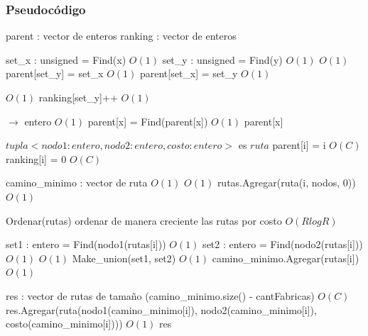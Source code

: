 \documentclass[a4paper, 10pt, twoside]{article}
\newenvironment{pseudo}[1][]{%
    \vspace{0.5em}%
    \begin{algorithmic}%
}
{%
    \end{algorithmic}%
    \vspace{0.5em}%
}
\newcommand{\Ode}[1]{\hfill $O(#1)$}
\begin{document}
\subsubsection{Pseudocódigo}
\begin{pseudo}

\State parent : vector de enteros
\State ranking : vector de enteros

    \State set\_x : unsigned = Find(x)										\Ode{1}
    \State set\_y : unsigned = Find(y)										\Ode{1}
    								\Ode{1}
		\State parent[set\_y] = set\_x										\Ode{1}
    \Else
        \State parent[set\_x] = set\_y										\Ode{1}
    \EndIf
    
    									\Ode{1}
        \State ranking[set\_y]++											\Ode{1}
    \EndIf
\EndProcedure



 $\rightarrow$ entero
    														\Ode{1}
        \State parent[x] = Find(parent[x])									\Ode{1}
    \EndIf
    \Return parent[x]
\EndProcedure



\State $tupla <nodo1 : entero, nodo2 : entero, costo : entero>$ es $ruta$
	 parent[i] = i \EndFor						\Ode{C}
	 ranking[i] = 0 \EndFor						\Ode{C}

    \State camino\_minimo : vector de ruta									\Ode{1}
    								\Ode{1}
        \State rutas.Agregar(ruta(i, nodos, 0))								\Ode{1}
    \EndFor

	

    \State Ordenar(rutas) ordenar de manera creciente las rutas por costo \Ode{R log R}

        \State set1 : entero = Find(nodo1(rutas[i]))						\Ode{1}
        \State set2 : entero = Find(nodo2(rutas[i]))						\Ode{1}
        													\Ode{1}
            \State Make\_union(set1, set2)									\Ode{1}
            \State camino\_minimo.Agregar(rutas[i])							\Ode{1}
        \EndIf    
    \EndFor

	 

    \State res : vector de rutas de tamaño (camino\_minimo.size() - cantFabricas)   \Ode{C}
        \State res.Agregar(ruta(nodo1(camino\_minimo[i]), nodo2(camino\_minimo[i]), costo(camino\_minimo[i])))	\Ode{1}
    \EndFor
    \Return res
\EndProcedure

\end{pseudo}
\end{document}
